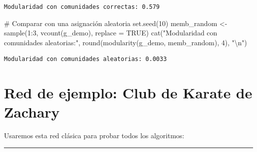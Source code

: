 \documentclass[
  letterpaper,
  DIV=11,
  numbers=noendperiod]{scrreprt}
\newenvironment{Shaded}{\begin{snugshade}}{\end{snugshade}}
\newcommand{\AttributeTok}[1]{\textcolor[rgb]{0.40,0.45,0.13}{#1}}
\newcommand{\CommentTok}[1]{\textcolor[rgb]{0.37,0.37,0.37}{#1}}
\newcommand{\ConstantTok}[1]{\textcolor[rgb]{0.56,0.35,0.01}{#1}}
\newcommand{\DecValTok}[1]{\textcolor[rgb]{0.68,0.00,0.00}{#1}}
\newcommand{\FunctionTok}[1]{\textcolor[rgb]{0.28,0.35,0.67}{#1}}
\newcommand{\NormalTok}[1]{\textcolor[rgb]{0.00,0.23,0.31}{#1}}
\newcommand{\OtherTok}[1]{\textcolor[rgb]{0.00,0.23,0.31}{#1}}
\newcommand{\SpecialCharTok}[1]{\textcolor[rgb]{0.37,0.37,0.37}{#1}}
\newcommand{\StringTok}[1]{\textcolor[rgb]{0.13,0.47,0.30}{#1}}
\begin{document}
\begin{verbatim}
Modularidad con comunidades correctas: 0.579 
\end{verbatim}

\begin{Shaded}
\begin{Highlighting}[]
\CommentTok{\# Comparar con una asignación aleatoria}
\FunctionTok{set.seed}\NormalTok{(}\DecValTok{10}\NormalTok{)}
\NormalTok{memb\_random }\OtherTok{\textless{}{-}} \FunctionTok{sample}\NormalTok{(}\DecValTok{1}\SpecialCharTok{:}\DecValTok{3}\NormalTok{, }\FunctionTok{vcount}\NormalTok{(g\_demo), }\AttributeTok{replace =} \ConstantTok{TRUE}\NormalTok{)}
\FunctionTok{cat}\NormalTok{(}\StringTok{"Modularidad con comunidades aleatorias:"}\NormalTok{, }
    \FunctionTok{round}\NormalTok{(}\FunctionTok{modularity}\NormalTok{(g\_demo, memb\_random), }\DecValTok{4}\NormalTok{), }\StringTok{"}\SpecialCharTok{\textbackslash{}n}\StringTok{"}\NormalTok{)}
\end{Highlighting}
\end{Shaded}

\begin{verbatim}
Modularidad con comunidades aleatorias: 0.0033 
\end{verbatim}

\section{Red de ejemplo: Club de Karate de
Zachary}\label{red-de-ejemplo-club-de-karate-de-zachary}

Usaremos esta red clásica para probar todos los algoritmos:

\begin{Shaded}
\end{Shaded}

\begin{center}\rule{0.5\linewidth}{0.5pt}\end{center}
\end{document}

